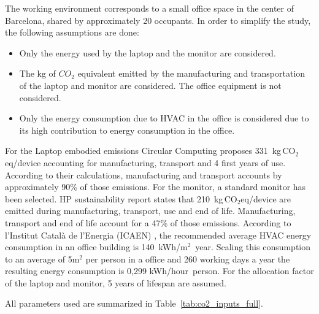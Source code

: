 The working environment corresponds to a small office space in the center of Barcelona, shared by approximately 20 occupants. In order to simplify the 
study, the following assumptions are done:

\begin{itemize}
    \item Only the energy used by the laptop and the monitor are considered.
    \item The kg of $CO_2$ equivalent emitted by the manufacturing and transportation of the laptop and monitor are considered. The office equipment is not considered.
    \item Only the energy consumption due to HVAC in the office is considered due to its high contribution to energy consumption in the office.
\end{itemize}


For the Laptop embodied emissions Circular Computing \cite{CircularComputing2022} proposes 331~kg\,CO$_2$eq/device accounting for manufacturing,
transport and 4 first years of use. According to their calculations, manufacturing and transport accounts by approximately 90\% of those emissions.
For the monitor, a standard monitor has been selected. HP sustainability report \cite{HP2021MonitorLCA} states that 210~kg\,CO$_2$eq/device 
are emitted during manufacturing, transport, use and end of life. Manufacturing, transport and end of life account for a 47\% of those emissions.
According to l'Institut Català de l'Energia (ICAEN) \cite{ICAEN}, the recommended average HVAC energy consumption in an office building is 140~kWh/m$^2$~year. 
Scaling this consumption to an average of 5m$^2$ per person in a office and 260 working days a year the resulting energy consumption is 
0,299 kWh/hour~person. For the allocation factor of the laptop and monitor, 5 years of lifespan are assumed.

All parameters used are summarized in Table~\ref{tab:co2_inputs_full}.

